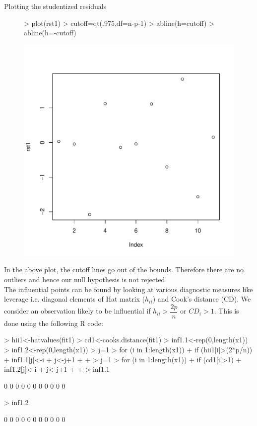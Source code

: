 \documentclass[12pt]{article}
\begin{document}
\begin{itemize}
Plotting the studentized residuals
\begin{figure}[H]
\begin{Schunk}
\begin{Sinput}
> plot(rst1)
> cutoff=qt(.975,df=n-p-1)
> abline(h=cutoff)
> abline(h=-cutoff)
\end{Sinput}
\end{Schunk}
\includegraphics{HW6-006}
\end{figure}

In the above plot, the cutoff lines go out of the bounds. Therefore there are no outliers and hence our null hypothesis is not rejected.\\
The influential points can be found by looking at various diagnostic measures like leverage i.e. diagonal elements of Hat matrix ($h_{ii}$) and Cook's distance (CD). We consider an observation likely to be influential if $h_{ii}>\dfrac{2p}{n}$ or $CD_{i}>1$. This is done using the following R code:

\begin{Schunk}
\begin{Sinput}
> hii1<-hatvalues(fit1)
> cd1<-cooks.distance(fit1)
> inf1.1<-rep(0,length(x1))
> inf1.2<-rep(0,length(x1))
> j=1
> for (i in 1:length(x1)){
+   if (hii1[i]>(2*p/n)){
+     inf1.1[j]<-i
+     j<-j+1
+   }
+ }
> j=1
> for (i in 1:length(x1)){
+   if (cd1[i]>1){
+     inf1.2[j]<-i
+     j<-j+1
+   }
+ }
> inf1.1
\end{Sinput}
\begin{Soutput}
 [1] 0 0 0 0 0 0 0 0 0 0 0
\end{Soutput}
\begin{Sinput}
> inf1.2
\end{Sinput}
\begin{Soutput}
 [1] 0 0 0 0 0 0 0 0 0 0 0
\end{Soutput}
\end{Schunk}
\clearpage


\end{itemize}
\end{document}
